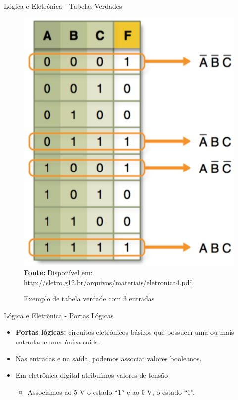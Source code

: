 	\begin{frame}{Lógica e Eletrônica - Tabelas Verdades}
			\begin{figure}[h]
				\centering
				\caption{Exemplo de tabela verdade com 3 entradas }
				\includegraphics[height=0.7\textheight]{img/ed/ed-tabela_circuito2.png}
				\\
				{\footnotesize \textbf{Fonte:} Disponível em: \url{http://eletro.g12.br/arquivos/materiais/eletronica4.pdf}.}
				\label{fig:ed-tabela_circuito2}
			\end{figure}
	\end{frame}

	\begin{frame}{Lógica e Eletrônica - Portas Lógicas}
		\begin{itemize}
			\setlength\itemsep{1.5em}
			\item \textbf{Portas lógicas:} circuitos eletrônicos básicos que possuem uma ou mais entradas e uma única saída.

			\item Nas entradas e na saída, podemos associar valores booleanos.

				\bigskip

			\item Em eletrônica digital atribuímos valores de tensão
			\begin{itemize}
				\item Associamos ao $ 5 $ V o estado ``$ 1 $'' e ao $ 0 $ V, o estado ``$ 0 $''.
			\end{itemize}
		\end{itemize}
	\end{frame}


